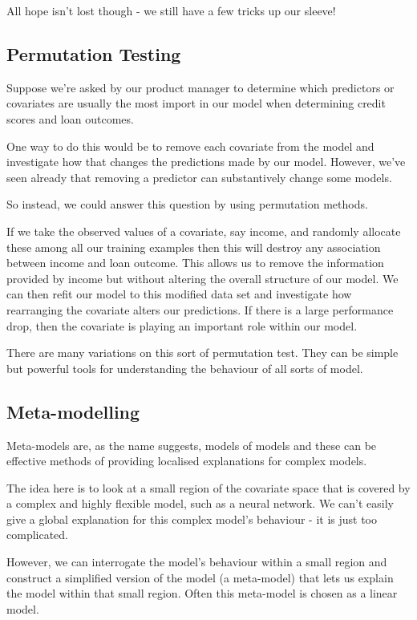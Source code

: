 \documentclass[
  12pt,
]{book}
\begin{document}
All hope isn't lost though - we still have a few tricks up our sleeve!

\hypertarget{permutation-testing}{%
\subsection{Permutation Testing}\label{permutation-testing}}

Suppose we're asked by our product manager to determine which predictors or covariates are usually the most import in our model when determining credit scores and loan outcomes.

One way to do this would be to remove each covariate from the model and investigate how that changes the predictions made by our model. However, we've seen already that removing a predictor can substantively change some models.

So instead, we could answer this question by using permutation methods.

If we take the observed values of a covariate, say income, and randomly allocate these among all our training examples then this will destroy any association between income and loan outcome. This allows us to remove the information provided by income but without altering the overall structure of our model. We can then refit our model to this modified data set and investigate how rearranging the covariate alters our predictions. If there is a large performance drop, then the covariate is playing an important role within our model.

There are many variations on this sort of permutation test. They can be simple but powerful tools for understanding the behaviour of all sorts of model.

\hypertarget{meta-modelling}{%
\subsection{Meta-modelling}\label{meta-modelling}}

Meta-models are, as the name suggests, models of models and these can be effective methods of providing localised explanations for complex models.

The idea here is to look at a small region of the covariate space that is covered by a complex and highly flexible model, such as a neural network. We can't easily give a global explanation for this complex model's behaviour - it is just too complicated.

However, we can interrogate the model's behaviour within a small region and construct a simplified version of the model (a meta-model) that lets us explain the model within that small region. Often this meta-model is chosen as a linear model.
\end{document}
